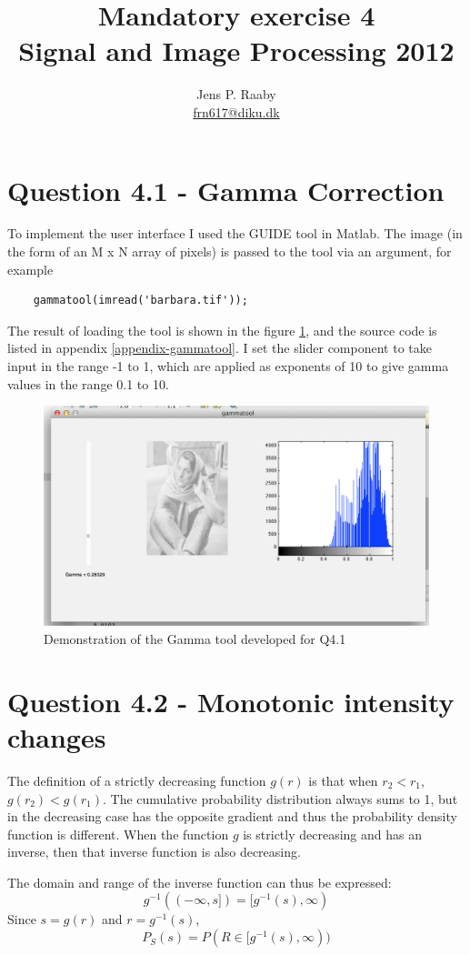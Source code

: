 \documentclass[a4paper]{article}
\title{Mandatory exercise 4 \\
Signal and Image Processing 2012}
\author{Jens P. Raaby \\
\url{frn617@diku.dk}}
\begin{document}
 
\maketitle

\section*{Question 4.1 - Gamma Correction} To implement the user interface I used the GUIDE tool in Matlab. The image (in the form of an M x N array of pixels) is passed to the tool via an argument, for example 
\begin{lstlisting}
	gammatool(imread('barbara.tif')); 
\end{lstlisting}

The result of loading the tool is shown in the figure \ref{q1demo}, and the source code is listed in appendix \ref{appendix-gammatool}. I set the slider component to take input in the range -1 to 1, which are applied as exponents of 10 to give gamma values in the range 0.1 to 10.
\begin{figure}[h]
	\centering 
	\includegraphics[width=0.7
	\textwidth]{gammatool.png} \caption{Demonstration of the Gamma tool developed for Q4.1} \label{q1demo} 
\end{figure}
\section*{Question 4.2 - Monotonic intensity changes} 
The definition of a strictly decreasing function $g(r)$ is that when $r_2 < r_1$, $g(r_2) < g(r_1)$.
The cumulative probability distribution always sums to 1, but in the decreasing case has the opposite gradient and thus the probability density function is different. When the function $g$ is strictly decreasing and has an inverse, then that inverse function is also decreasing.

The domain and range of the inverse function can thus be expressed:
\begin{equation}
	g^{-1}(( -\infty, s]) = [g^{-1}(s),\infty)    
\end{equation}
Since $s = g(r)$ and $r = g^{-1}(s)$, 
\begin{equation}
    P_S(s) = P(R \in [g^{-1}(s), \infty))
    \label{PrRange}
\end{equation}
\end{document}
